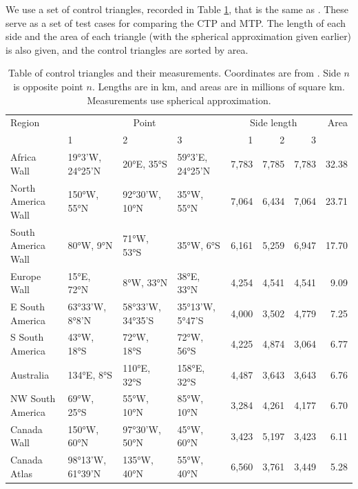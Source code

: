 \documentclass[]{interact}
\begin{document}
We use a set of control triangles, recorded in Table \ref{table:ctrlpts}, that
is the same as \citet[p.~90]{christensen}. These serve as a set of
test cases for comparing the CTP and MTP. The length of each side and the area
of each triangle (with the spherical approximation given earlier) is also given,
and the control triangles are sorted by area.

\begin{table}
\begin{tabular}{ p{2.5cm} | p{1.3cm} p{1.3cm} p{1.4cm} | r r r | r }
Region & \multicolumn{3}{c}{Point} &
  \multicolumn{3}{c}{Side length} &  Area \\
& 1 & 2 & 3 & 1 & 2 & 3 & \\
\hline
Africa Wall & 19°3'W, 24°25'N & 20°E, 35°S & 59°3'E, 24°25'N &
  7,783 & 7,785 & 7,783 & 32.38 \\
North \mbox{America} Wall & 150°W, 55°N & 92°30'W, 10°N & 35°W, 55°N &
  7,064 & 6,434 & 7,064 & 23.71 \\
South \mbox{America} Wall & 80°W, 9°N & 71°W, 53°S & 35°W, 6°S &
  6,161 & 5,259 & 6,947 & 17.70 \\
Europe Wall & 15°E, 72°N & 8°W, 33°N & 38°E, 33°N &
  4,254 & 4,541 & 4,541 & 9.09 \\
E South \mbox{America} & 63°33'W, 8°8'N & 58°33'W, 34°35'S & 35°13'W, 5°47'S &
  4,000 & 3,502 & 4,779 & 7.25 \\
S South \mbox{America} & 43°W, 18°S & 72°W, 18°S & 72°W, 56°S &
  4,225 & 4,874 & 3,064 & 6.77 \\
Australia & 134°E, 8°S & 110°E, 32°S & 158°E, 32°S &
  4,487 & 3,643 & 3,643 & 6.76 \\
NW South \mbox{America} & 69°W, 25°S & 55°W, 10°N & 85°W, 10°N &
  3,284 & 4,261 & 4,177 & 6.70 \\
Canada Wall & 150°W, 60°N & 97°30'W, 50°N & 45°W, 60°N &
  3,423 & 5,197 & 3,423 & 6.11 \\
Canada \mbox{Atlas} & 98°13'W, 61°39'N & 135°W, 40°N & 55°W, 40°N &
  6,560 & 3,761 & 3,449 & 5.28
\end{tabular}
\caption{Table of control triangles and their measurements. Coordinates are from
\citet{christensen}. Side $n$ is opposite point $n$. Lengths are in km,
and areas are in millions of square km.
Measurements use spherical approximation.}
\label{table:ctrlpts}
\end{table}
\end{document}
